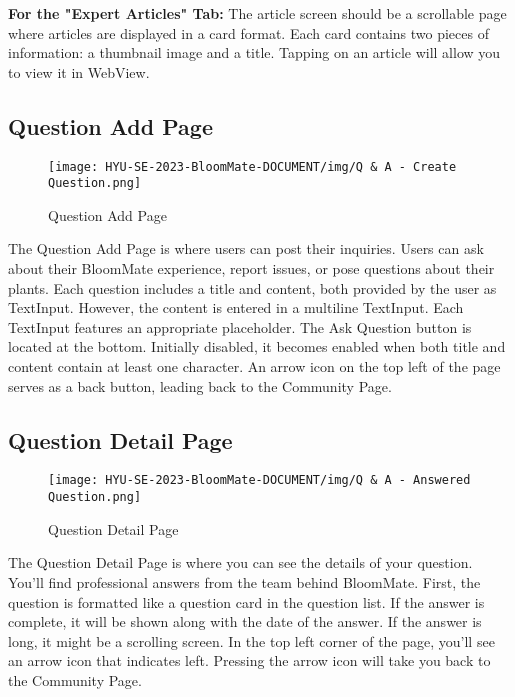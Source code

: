 \documentclass[conference, a4paper]{IEEEtran}
\begin{document}
\textbf{For the "Expert Articles" Tab:} The article screen should be a scrollable page where articles are displayed in a card format. Each card contains two pieces of information: a thumbnail image and a title. Tapping on an article will allow you to view it in WebView.

\subsection{Question Add Page}
    \begin{figure}[h]
    \centering
    \texttt{[image: HYU-SE-2023-BloomMate-DOCUMENT/img/Q \& A - Create Question.png]}
    \label{fig}
    \caption{Question Add Page}
    \end{figure}
    
The Question Add Page is where users can post their inquiries. Users can ask about their BloomMate experience, report issues, or pose questions about their plants. Each question includes a title and content, both provided by the user as TextInput. However, the content is entered in a multiline TextInput. Each TextInput features an appropriate placeholder. The Ask Question button is located at the bottom. Initially disabled, it becomes enabled when both title and content contain at least one character. An arrow icon on the top left of the page serves as a back button, leading back to the Community Page.

\subsection{Question Detail Page}
    \begin{figure}[h]
    \centering
    \texttt{[image: HYU-SE-2023-BloomMate-DOCUMENT/img/Q \& A - Answered Question.png]}
    \label{fig}
    \caption{Question Detail Page}
    \end{figure}
The Question Detail Page is where you can see the details of your question. You'll find professional answers from the team behind BloomMate. First, the question is formatted like a question card in the question list. If the answer is complete, it will be shown along with the date of the answer. If the answer is long, it might be a scrolling screen. In the top left corner of the page, you'll see an arrow icon that indicates left. Pressing the arrow icon will take you back to the Community Page.
\end{document}
